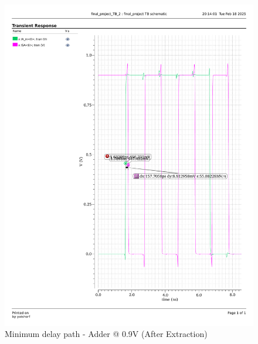 \documentclass[a4paper,12pt]{article}
\begin{document}
\begin{figure}[H]
    \centering
    \begin{minipage}{0.49\textwidth}
        \centering
        \includegraphics[width=\textwidth]{delay/CP_min_add_0.9_ex.pdf}
        \caption{Minimum delay path - Adder @ 0.9V (After Extraction)}
    \end{minipage}
    \hfill
    \begin{minipage}{0.49\textwidth}
        \centering

\end{minipage}
\end{figure}
\end{document}
